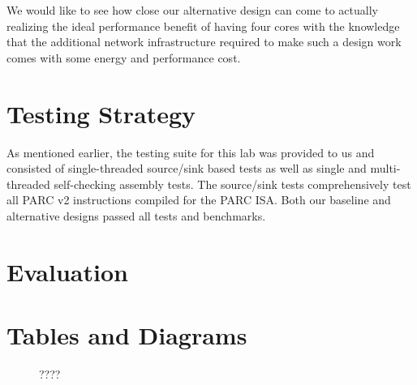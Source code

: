 \documentclass[10pt]{article}
\begin{document}
We would like to see how close our alternative design can come to actually realizing the ideal performance benefit of having four cores with the knowledge that the additional network infrastructure required to make such a design work comes with some energy and performance cost.


\section{Testing Strategy}

As mentioned earlier, the testing suite for this lab was provided to us and consisted of single-threaded source/sink based tests as well as single and multi-threaded self-checking assembly tests. The source/sink tests comprehensively test all PARC v2 instructions compiled for the PARC ISA. Both our baseline and alternative designs passed all tests and benchmarks. 



\section{Evaluation}

% 


\newpage
\section {Tables and Diagrams}


\begin{figure}[h]
	\centering
	\label{fig:bline}
	\caption{????}
\end{figure}
\end{document}
